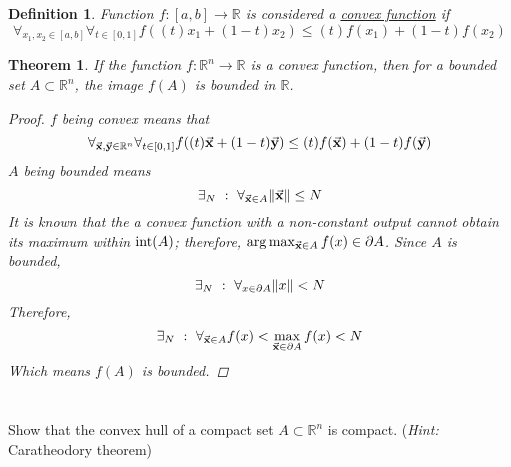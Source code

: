 \documentclass[]{article}
\newcommand{\R}{\mathbb{R}}
\newcommand{\st}{\ : \ }
\newtheorem{definition}{Definition}
\newtheorem{theorem}{Theorem}
\begin{document}
\begin{definition}
    Function $f : [a,b] \to \R$ is considered a \emph{\underline{convex function}} if\[
        \forall_{x_1,x_2 \in [a,b]} \forall_{t \in [0,1]}
        f((t) x_1 + (1 - t) x_2) \leq (t) f(x_1) + (1 - t) f(x_2)
    \]
\end{definition}

\begin{theorem}
    If the function $f : \R^n \to \R$ is a convex function,
    then for a bounded set $A \subset \R^n$, the image $f(A)$ is bounded in $\R$.
    \begin{proof}
        $f$ being convex means that\[
            \forall_{\va{x},\va{y} \in \R^n} \forall_{t \in [0,1]}
                f((t) \va{x} + (1 - t) \va{y}) \leq (t) f(\va{x}) + (1 - t) f(\va{y})
        \]
        $A$ being bounded means\[
            \exists_{N} \st \forall_{\va{x} \in A}  \norm{\va{x}} \leq N
        \]
        It is known that the a convex function with a non-constant output cannot obtain its maximum within $\textnormal{int}(A)$;
        therefore, $\arg \max_{\va{x} \in A} f(x) \in \partial A$.
        Since $A$ is bounded, \[
            \exists_N \st \forall_{x \in \partial A} \norm{x} < N
        \]
        Therefore, \[
            \exists_N \st \forall_{\va{x} \in A} f(x) < \max_{\va{x} \in \partial A} f(x) < N
        \]
        Which means $f(A)$ is bounded.
    \end{proof}
\end{theorem}

\newpage
\section{}
Show that the convex hull of a compact set $A \subset \R^n$ is compact.
(\textit{Hint:} Caratheodory theorem)
\end{document}
